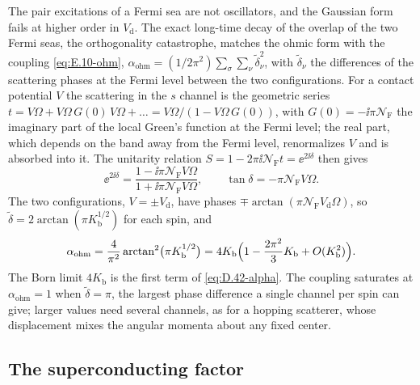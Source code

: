 The pair excitations of a Fermi sea are not oscillators, and the Gaussian form fails at higher order in $V_{\mathrm{d}}$. The exact long-time decay of the overlap of the two Fermi seas, the orthogonality catastrophe, matches the ohmic form with the coupling \cref{eq:E.10-ohm}, $\alpha_{\mathrm{ohm}} = (1/2\pi^2)\sum_\sigma\sum_\nu\tilde\delta_\nu^2$, with $\tilde\delta_\nu$ the differences of the scattering phases at the Fermi level between the two configurations. For a contact potential $V$ the scattering in the $s$ channel is the geometric series $t = V\Omega + V\Omega\,G(0)\,V\Omega + \dots = V\Omega/(1 - V\Omega\,G(0))$, with $G(0) = -\ii\pi\mathcal{N}_{\mathrm{F}}$ the imaginary part of the local Green's function at the Fermi level; the real part, which depends on the band away from the Fermi level, renormalizes $V$ and is absorbed into it. The unitarity relation $S = 1 - 2\pi\ii\mathcal{N}_{\mathrm{F}}t = \ee^{2\ii\delta}$ then gives
\begin{equation*}
  \ee^{2\ii\delta} = \frac{1 - \ii\pi\mathcal{N}_{\mathrm{F}}V\Omega}{1 + \ii\pi\mathcal{N}_{\mathrm{F}}V\Omega} , \qquad \tan\delta = -\pi\mathcal{N}_{\mathrm{F}}V\Omega .
\end{equation*}
The two configurations, $V = \pm V_{\mathrm{d}}$, have phases $\mp\arctan(\pi\mathcal{N}_{\mathrm{F}}V_{\mathrm{d}}\Omega)$, so $\tilde\delta = 2\arctan(\pi K_{\mathrm{b}}^{1/2})$ for each spin, and
\begin{equation}
  \alpha_{\mathrm{ohm}} = \frac{4}{\pi^2}\arctan^2\bigl(\pi K_{\mathrm{b}}^{1/2}\bigr) = 4K_{\mathrm{b}}\Bigl(1 - \frac{2\pi^2}{3}K_{\mathrm{b}} + O(K_{\mathrm{b}}^2)\Bigr) .
  \label{eq:D.42-alpha}
\end{equation}
The Born limit $4K_{\mathrm{b}}$ is the first term of \cref{eq:D.42-alpha}. The coupling saturates at $\alpha_{\mathrm{ohm}} = 1$ when $\tilde\delta = \pi$, the largest phase difference a single channel per spin can give; larger values need several channels, as for a hopping scatterer, whose displacement mixes the angular momenta about any fixed center.

\subsection*{The superconducting factor}

